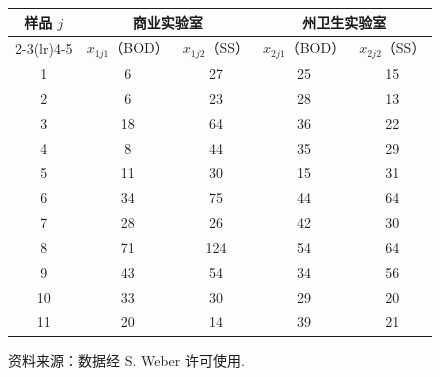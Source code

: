 \begin{mvtable}
\label{tab:6.1}
\begin{tabular}{ccccc}
\toprule
\multirow{2}{*}{样品 $j$} & \multicolumn{2}{c}{商业实验室} & \multicolumn{2}{c}{州卫生实验室}\\
\cmidrule(lr){2-3}\cmidrule(lr){4-5}
& $x_{1j1}$（BOD） & $x_{1j2}$（SS） & $x_{2j1}$（BOD） & $x_{2j2}$（SS）\\
\midrule
1 & 6 & 27 & 25 & 15\\
2 & 6 & 23 & 28 & 13\\
3 & 18 & 64 & 36 & 22\\
4 & 8 & 44 & 35 & 29\\
5 & 11 & 30 & 15 & 31\\
6 & 34 & 75 & 44 & 64\\
7 & 28 & 26 & 42 & 30\\
8 & 71 & 124 & 54 & 64\\
9 & 43 & 54 & 34 & 56\\
10 & 33 & 30 & 29 & 20\\
11 & 20 & 14 & 39 & 21\\
\bottomrule
\end{tabular}
\end{mvtable}

{\small 资料来源：数据经 S. Weber 许可使用.}
